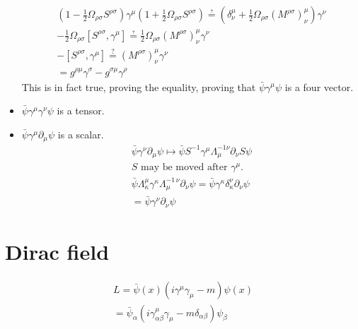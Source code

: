 \documentclass[]{scrartcl}
\begin{document}
\begin{itemize}
\begin{gather}
		\left(1 - \frac{1}{2}\Omega_{\rho\sigma} S^{\rho\sigma}\right)\gamma^\mu\left(1 + \frac{1}{2}\Omega_{\rho\sigma}S^{\rho\sigma}\right) \questeq \left( \delta^\mu_\nu + \frac{1}{2}\Omega_{\rho\sigma}(M^{\rho\sigma})^\mu_\nu\right)\gamma^\nu\\
		-\frac{1}{2}\Omega_{\rho\sigma}[S^{\rho\sigma},\gamma^\mu] \questeq \frac{1}{2}\Omega_{\rho\sigma}(M^{\rho\sigma})^\mu_\nu\gamma^\nu\\
		-[S^{\rho\sigma}, \gamma^\mu] \overset{?}{=} (M^{\rho\sigma})^\mu_\nu\gamma^\nu\\
		= g^{\rho\mu}\gamma^\sigma - g^{\sigma\mu}\gamma^\rho
	\end{gather}
	This is in fact true, proving the equality, proving that $\bar\psi\gamma^\mu\psi$ is a four vector.
	\item $\bar\psi\gamma^\mu\gamma^\nu\psi$ is a tensor.
	\item $\bar\psi\gamma^\mu\partial_\mu\psi$ is a scalar.
		\begin{gather}
		\bar\psi\gamma^\nu\partial_\mu \psi \mapsto \bar\psi S^{-1}\gamma^\mu \Lambda^{-1\nu}_\mu\partial_\nu S\psi\\
		\text{$S$ may be moved after $\gamma^\mu$.}\nonumber\\
		\bar\psi\Lambda^\mu_\kappa \gamma^\kappa\Lambda^{-1\,\nu}_\mu\partial_\nu\psi = \bar\psi \gamma^\kappa \delta^\nu_\kappa \partial_\nu \psi\\
		= \bar\psi\gamma^\nu\partial_\nu\psi
		\end{gather}
\end{itemize}

\section{Dirac field}

\begin{gather}
	L = \bar\psi(x)(i\gamma^\mu\gamma_\mu - m)\psi(x)\\
	=\bar\psi_\alpha(i\gamma^\mu_{\alpha\beta}\gamma_\mu-m\delta_{\alpha\beta})\psi_\beta
\end{gather}
\end{document}
